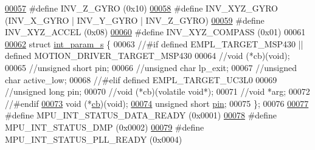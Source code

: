 \begin{DoxyCode}
\hypertarget{inv__mpu_8h_source.tex_l00057}{}\hyperlink{group___d_r_i_v_e_r_s_ga50205b5cc6089b33b2561c854eb8b0fd}{00057} \textcolor{preprocessor}{#define INV\_Z\_GYRO      (0x10)}
\hypertarget{inv__mpu_8h_source.tex_l00058}{}\hyperlink{group___d_r_i_v_e_r_s_ga3fdc30f9c0a26c2c4e2bb88921f91629}{00058} \textcolor{preprocessor}{#define INV\_XYZ\_GYRO    (INV\_X\_GYRO | INV\_Y\_GYRO | INV\_Z\_GYRO)}
\hypertarget{inv__mpu_8h_source.tex_l00059}{}\hyperlink{group___d_r_i_v_e_r_s_gaa03f025a17ed491e70b88274e89c75c5}{00059} \textcolor{preprocessor}{#define INV\_XYZ\_ACCEL   (0x08)}
\hypertarget{inv__mpu_8h_source.tex_l00060}{}\hyperlink{group___d_r_i_v_e_r_s_ga7fc9c1dbdcb2ac8cc2a4128a5799482a}{00060} \textcolor{preprocessor}{#define INV\_XYZ\_COMPASS (0x01)}
00061 
\hypertarget{inv__mpu_8h_source.tex_l00062}{}\hyperlink{structint__param__s}{00062} \textcolor{keyword}{struct }\hyperlink{structint__param__s}{int\_param\_s} \{
00063 \textcolor{comment}{//#if defined EMPL\_TARGET\_MSP430 || defined MOTION\_DRIVER\_TARGET\_MSP430}
00064     \textcolor{comment}{//void (*cb)(void);}
00065     \textcolor{comment}{//unsigned short pin;}
00066     \textcolor{comment}{//unsigned char lp\_exit;}
00067     \textcolor{comment}{//unsigned char active\_low;}
00068 \textcolor{comment}{//#elif defined EMPL\_TARGET\_UC3L0}
00069     \textcolor{comment}{//unsigned long pin;}
00070     \textcolor{comment}{//void (*cb)(volatile void*);}
00071     \textcolor{comment}{//void *arg;}
00072 \textcolor{comment}{//#endif}
\hypertarget{inv__mpu_8h_source.tex_l00073}{}\hyperlink{group___d_r_i_v_e_r_s_ga574999a803893e57b48324e39a5daa19}{00073}     void (*\hyperlink{group___d_r_i_v_e_r_s_ga574999a803893e57b48324e39a5daa19}{cb})(void);
\hypertarget{inv__mpu_8h_source.tex_l00074}{}\hyperlink{group___d_r_i_v_e_r_s_ga503508a7ee88d8566cb3c882db1311b2}{00074}     \textcolor{keywordtype}{unsigned} \textcolor{keywordtype}{short} \hyperlink{group___d_r_i_v_e_r_s_ga503508a7ee88d8566cb3c882db1311b2}{pin};
00075 \};
00076 
\hypertarget{inv__mpu_8h_source.tex_l00077}{}\hyperlink{group___d_r_i_v_e_r_s_ga0cddf0dffaf3bf65fd3ed92dda4f3193}{00077} \textcolor{preprocessor}{#define MPU\_INT\_STATUS\_DATA\_READY       (0x0001)}
\hypertarget{inv__mpu_8h_source.tex_l00078}{}\hyperlink{group___d_r_i_v_e_r_s_ga380dd1ef256931e99302c371ad7752f4}{00078} \textcolor{preprocessor}{#define MPU\_INT\_STATUS\_DMP              (0x0002)}
\hypertarget{inv__mpu_8h_source.tex_l00079}{}\hyperlink{group___d_r_i_v_e_r_s_gaa38d7976e86186bf353cb89ca7561f29}{00079} \textcolor{preprocessor}{#define MPU\_INT\_STATUS\_PLL\_READY        (0x0004)}

\end{DoxyCode}
